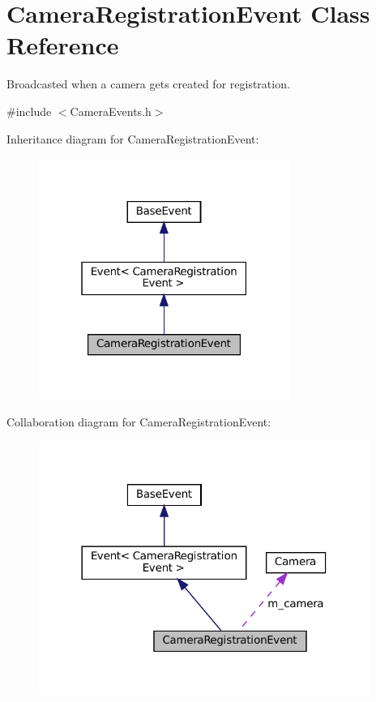 \hypertarget{classCameraRegistrationEvent}{}\section{Camera\+Registration\+Event Class Reference}
\label{classCameraRegistrationEvent}


Broadcasted when a camera gets created for registration.  




{\ttfamily \#include $<$Camera\+Events.\+h$>$}



Inheritance diagram for Camera\+Registration\+Event\+:\nopagebreak
\begin{figure}[H]
\begin{center}
\leavevmode
\includegraphics[width=232pt]{classCameraRegistrationEvent__inherit__graph}
\end{center}
\end{figure}


Collaboration diagram for Camera\+Registration\+Event\+:\nopagebreak
\begin{figure}[H]
\begin{center}
\leavevmode
\includegraphics[width=306pt]{classCameraRegistrationEvent__coll__graph}
\end{center}
\end{figure}
